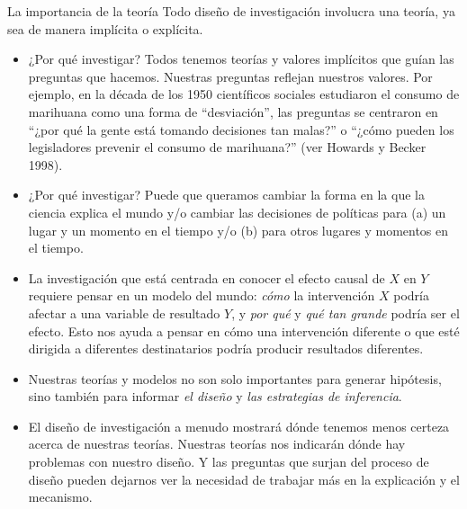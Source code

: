 \documentclass[
  ignorenonframetext,
]{beamer}
\begin{document}
\begin{frame}[allowframebreaks]{La importancia de la teoría}
\protect\hypertarget{la-importancia-de-la-teoruxeda}{}
Todo diseño de investigación involucra una teoría, ya sea de manera
implícita o explícita.

\begin{itemize}
\item
  ¿Por qué investigar? Todos tenemos teorías y valores implícitos que
  guían las preguntas que hacemos. Nuestras preguntas reflejan nuestros
  valores. Por ejemplo, en la década de los 1950 científicos sociales
  estudiaron el consumo de marihuana como una forma de ``desviación'',
  las preguntas se centraron en ``¿por qué la gente está tomando
  decisiones tan malas?'' o ``¿cómo pueden los legisladores prevenir el
  consumo de marihuana?'' (ver Howards y Becker 1998).
\item
  ¿Por qué investigar? Puede que queramos cambiar la forma en la que la
  ciencia explica el mundo y/o cambiar las decisiones de políticas para
  (a) un lugar y un momento en el tiempo y/o (b) para otros lugares y
  momentos en el tiempo.
\item
  La investigación que está centrada en conocer el efecto causal de
  \(X\) en \(Y\) requiere pensar en un modelo del mundo: \emph{cómo} la
  intervención \(X\) podría afectar a una variable de resultado \(Y\), y
  \emph{por qué} y \emph{qué tan grande} podría ser el efecto. Esto nos
  ayuda a pensar en cómo una intervención diferente o que esté dirigida
  a diferentes destinatarios podría producir resultados diferentes.
\item
  Nuestras teorías y modelos no son solo importantes para generar
  hipótesis, sino también para informar \emph{el diseño} y \emph{las
  estrategias de inferencia}.
\item
  El diseño de investigación a menudo mostrará dónde tenemos menos
  certeza acerca de nuestras teorías. Nuestras teorías nos indicarán
  dónde hay problemas con nuestro diseño. Y las preguntas que surjan del
  proceso de diseño pueden dejarnos ver la necesidad de trabajar más en
  la explicación y el mecanismo.
\end{itemize}
\end{frame}
\end{document}
